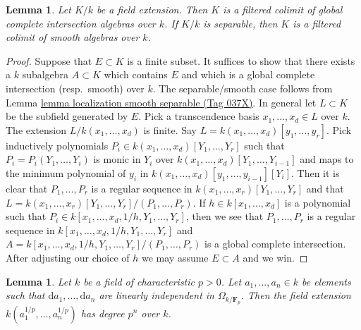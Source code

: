 \documentclass{amsart}
\theoremstyle{plain}
\newtheorem{lemma}[subsection]{Lemma}
\theoremstyle{definition}
\theoremstyle{remark}
\numberwithin{equation}{subsection}
\begin{document}
\begin{lemma}
\label{algebra-lemma-colimit-syntomic}
Let $K/k$ be a field extension.
Then $K$ is a filtered colimit of global complete intersection
algebras over $k$. If $K/k$ is separable, then $K$ is a filtered
colimit of smooth algebras over $k$.
\end{lemma}

\begin{proof}
Suppose that $E \subset K$ is a finite subset. It suffices to show that
there exists a $k$ subalgebra $A \subset K$ which contains $E$
and which is a global complete intersection (resp.\ smooth) over $k$.
The separable/smooth case follows from
Lemma \href{https://stacks.math.columbia.edu/tag/037X}{lemma localization smooth separable (Tag 037X)}.
In general let $L \subset K$ be the subfield generated by $E$.
Pick a transcendence basis $x_1, \ldots, x_d \in L$ over $k$.
The extension $L/k(x_1, \ldots, x_d)$ is finite.
Say $L = k(x_1, \ldots, x_d)[y_1, \ldots, y_r]$.
Pick inductively polynomials $P_i \in k(x_1, \ldots, x_d)[Y_1, \ldots, Y_r]$
such that $P_i = P_i(Y_1, \ldots, Y_i)$ is monic in $Y_i$ over
$k(x_1, \ldots, x_d)[Y_1, \ldots, Y_{i - 1}]$ and maps to the
minimum polynomial of $y_i$ in
$k(x_1, \ldots, x_d)[y_1, \ldots, y_{i - 1}][Y_i]$.
Then it is clear that $P_1, \ldots, P_r$ is a regular sequence
in $k(x_1, \ldots, x_r)[Y_1, \ldots, Y_r]$ and that
$L = k(x_1, \ldots, x_r)[Y_1, \ldots, Y_r]/(P_1, \ldots, P_r)$.
If $h \in k[x_1, \ldots, x_d]$ is a polynomial such that
$P_i \in k[x_1, \ldots, x_d, 1/h, Y_1, \ldots, Y_r]$, then
we see that $P_1, \ldots, P_r$ is a regular sequence in
$k[x_1, \ldots, x_d, 1/h, Y_1, \ldots, Y_r]$ and
$A = k[x_1, \ldots, x_d, 1/h, Y_1, \ldots, Y_r]/(P_1, \ldots, P_r)$
is a global complete intersection. After adjusting our choice of $h$
we may assume $E \subset A$ and we win.
\end{proof}


\begin{lemma}
\label{algebra-lemma-size-extension-pth-roots}
Let $k$ be a field of characteristic $p > 0$.
Let $a_1, \ldots, a_n \in k$ be elements such that
$\text{d}a_1, \ldots, \text{d}a_n$ are linearly independent in
$\Omega_{k/\mathbf{F}_p}$. Then the field extension
$k(a_1^{1/p}, \ldots, a_n^{1/p})$ has degree $p^n$ over $k$.
\end{lemma}
\end{document}
